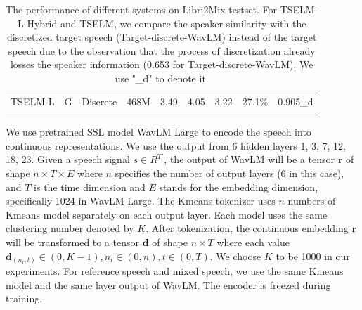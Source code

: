 \documentclass[conference]{IEEEtran}
\begin{document}
\begin{table}
\begin{center}
\begin{tabular}{ccccccccc}
            TSELM-L         & G         & Discrete                    & 468M                        & 3.49    & 4.05    & 3.22   & 27.1\%                & 0.905\_d \\
            \Xhline{2\arrayrulewidth} %
            \end{tabular}
            \linebreak
            \caption{The performance of different systems on Libri2Mix testset. For TSELM-L-Hybrid  
            and TSELM, we compare the speaker similarity with the discretized target speech 
            (Target-discrete-WavLM) instead of the target speech due to the observation that 
            the process of discretization already losses the speaker information (0.653 for 
            Target-discrete-WavLM). We use "\_d" to denote it.  }
            \label{main_exp}
      \end{center}
  \end{table}


We use pretrained SSL model WavLM Large \cite{wavlm} to 
encode the speech into continuous representations. We use the output from 6 hidden 
layers 1, 3, 7, 12, 18, 23. Given a speech signal \(s \in R^{T'} \), the output 
of WavLM will be a tensor \(\bm{r}\) of shape \(n \times T \times E\) where 
\(n\) specifies the number 
of output layers (6 in this case), and  \(T\) is the time 
dimension and \(E\) stands for the 
embedding dimension, specifically 1024 in WavLM Large. The Kmeans tokenizer uses \(n\) numbers of  Kmeans model 
separately on each output layer. Each model uses the same clustering number denoted by \(K\).
After tokenization, the continuous embedding \(\bm{r}\) will be transformed to a tensor \(\bm{d}\) of shape \(n \times T\) where each value \(\bm{d}_{(n_i,t)} \in (0, K-1), n_i \in (0,n), t \in 
(0, T)\). We choose \(K\) to be 1000 in our experiments. For reference speech and mixed speech, we 
use the same Kmeans model and the same layer output of WavLM. The encoder is freezed during training.
\end{document}
